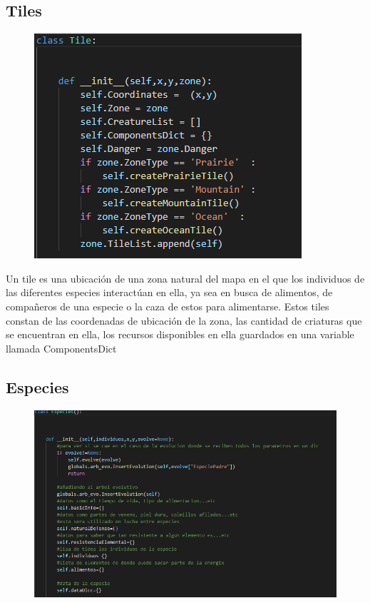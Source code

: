\documentclass{llncs}
\begin{document}
\subsection{Tiles}
\begin{figure}
	\centering
	\includegraphics[width=0.7\linewidth]{imagenes/Tile}
	\label{fig:tile}
\end{figure}

Un tile es una ubicación de una zona natural del mapa en el que los individuos de las diferentes especies interactúan en ella, ya sea en busca de alimentos, de compañeros de una especie o la caza de estos para alimentarse.
\newline
\newline
Estos tiles constan de las coordenadas de ubicación de la zona, las cantidad de criaturas que se encuentran en ella, los recursos disponibles en ella guardados en una variable llamada ComponentsDict

\subsection{Especies}
\begin{figure}
	\centering
	\includegraphics[width=0.7\linewidth]{imagenes/Especie}
	\label{fig:especie}
\end{figure}
\end{document}
